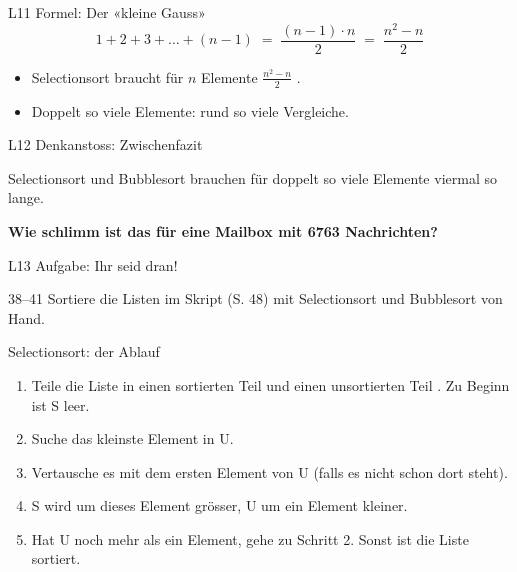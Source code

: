 \documentclass[aspectratio=169,12pt,xcolor={dvipsnames}]{beamer}
\begin{document}
\begin{frame}{L11 Formel: Der «kleine Gauss»}
  \vspace*{4mm}
  \[ 1 + 2 + 3 + \dots + (n-1) \;=\; \frac{(n-1)\cdot n}{2} \;=\; \frac{n^2-n}{2} \]
  \vspace{3mm}
  \begin{itemize}
    \item Selectionsort braucht für $n$ Elemente $\frac{n^2-n}{2}$ .
    \item Doppelt so viele Elemente: rund  so viele Vergleiche.
  \end{itemize}
\end{frame}

\begin{frame}{L12 Denkanstoss: Zwischenfazit}
  \vfill
  \begin{think}
    \large Selectionsort und Bubblesort brauchen für doppelt so viele Elemente viermal so lange.\par\medskip
    \textbf{Wie schlimm ist das für eine Mailbox mit 6763 Nachrichten?}
  \end{think}
  \vfill
\end{frame}

\begin{frame}[doit={zu zweit · 15 Min}]{L13 Aufgabe: Ihr seid dran!}
  \vfill
  \begin{task}{38–41}
    \large Sortiere die Listen im Skript (S. 48) mit Selectionsort und Bubblesort von Hand.
  \end{task}
  \vfill
\end{frame}

\begin{frame}[read={Skript S. 46}]{Selectionsort: der Ablauf}
  \begin{enumerate}
    \item Teile die Liste in einen sortierten Teil  und einen unsortierten Teil . Zu Beginn ist S leer.
    \item Suche das kleinste Element in U.
    \item Vertausche es mit dem ersten Element von U (falls es nicht schon dort steht).
    \item S wird um dieses Element grösser, U um ein Element kleiner.
    \item Hat U noch mehr als ein Element, gehe zu Schritt 2. Sonst ist die Liste sortiert.
  \end{enumerate}
\end{frame}
\end{document}
